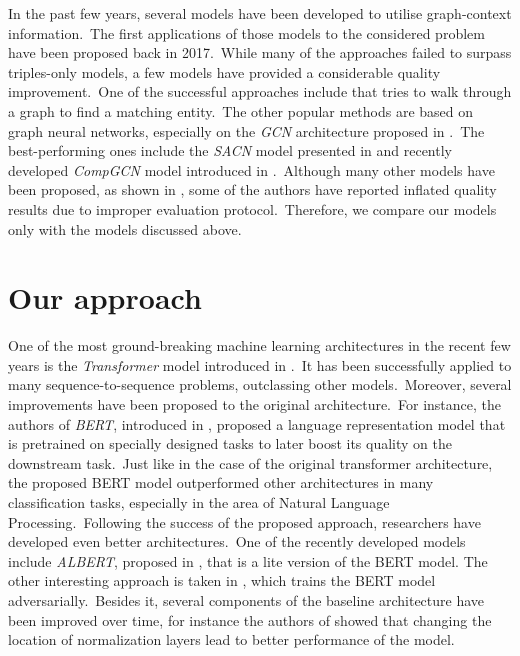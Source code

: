 \documentclass[longabstract, english, mgr]{iithesis}
\theoremstyle{default_theorem_style}\newtheorem{theorem}{Theorem}
\theoremstyle{default_theorem_style}\newtheorem{definition}{Definition}
\begin{document}
\noindent In the past few years, several models have been developed to utilise graph-context information.\ The first
applications of those models to the considered problem have been proposed back in 2017.\ While many of the
approaches failed to surpass triples-only models, a few models have provided a considerable quality
improvement.\ One of the successful approaches include \cite{go_for_a_walk_model} that tries to walk through a graph
to find a matching entity.\ The other popular methods are based on graph neural
networks, especially on the \textit{GCN} architecture proposed in \cite{gcn_model}.\ The best-performing ones
include the \textit{SACN} model presented in \cite{sacn_model} and recently developed \textit{CompGCN} model
introduced in \cite{comp_gcn_model}.\ Although many other models have been proposed, as shown in
\cite{re_evaluation}, some of the authors have reported inflated quality results due to improper evaluation
protocol.\ Therefore, we compare our models only with the models discussed above.

\section{Our approach}

One of the most ground-breaking machine learning architectures in the recent few years is the \textit{Transformer} model
introduced in \cite{transformer_model}.\ It has been successfully applied to many sequence-to-sequence problems,
outclassing other models.\ Moreover, several improvements have been proposed to the original architecture.\ For
instance, the authors of \textit{BERT}, introduced in \cite{bert_model}, proposed a language
representation model that is pretrained on specially designed tasks to later boost its quality on the downstream
task.\ Just like in the case of the original transformer architecture, the proposed BERT model outperformed other
architectures in many classification tasks, especially in the area of Natural Language Processing.\ Following the
success of the proposed approach, researchers have developed even better architectures.\ One of the recently
developed models include \textit{ALBERT}, proposed in \cite{albert_model}, that is a lite version of the BERT model.
The other interesting approach is taken in \cite{electra_model}, which trains the BERT model adversarially.\ Besides it,
several components of the baseline architecture have been improved over time, for instance the authors of
\cite{layer_normalization_in_transformers} showed that changing the location of normalization layers lead to better
performance of the model.\newline
\end{document}
